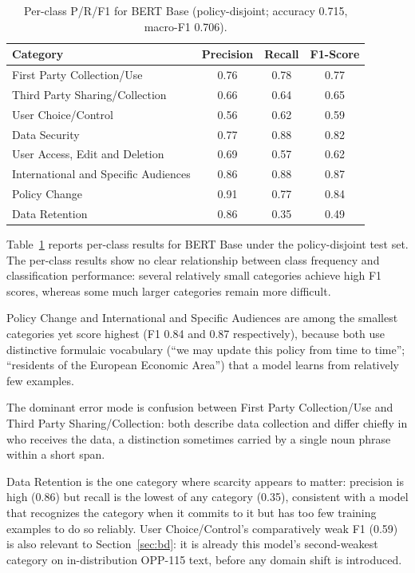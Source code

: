 \documentclass[11pt]{article}
\begin{document}
\begin{table}[t]
\centering
\footnotesize
\setlength{\tabcolsep}{3pt}
\begin{tabularx}{\columnwidth}{@{}Xccc@{}}
\toprule
\textbf{Category} & \textbf{Precision} & \textbf{Recall} & \textbf{F1-Score} \\
\midrule
First Party Collection/Use & 0.76 & 0.78 & 0.77 \\
Third Party Sharing/Collection & 0.66 & 0.64 & 0.65 \\
User Choice/Control & 0.56 & 0.62 & 0.59 \\
Data Security & 0.77 & 0.88 & 0.82 \\
User Access, Edit and Deletion & 0.69 & 0.57 & 0.62 \\
International and Specific Audiences & 0.86 & 0.88 & 0.87 \\
Policy Change & 0.91 & 0.77 & 0.84 \\
Data Retention & 0.86 & 0.35 & 0.49 \\
\bottomrule
\end{tabularx}
\caption{Per-class P/R/F1 for BERT Base (policy-disjoint; accuracy 0.715, macro-F1 0.706).}
\label{tab:perclass}
\end{table}

Table~\ref{tab:perclass} reports per-class results for BERT Base under the policy-disjoint test set. The per-class results show no clear relationship between class frequency and classification performance: several relatively small categories achieve high F1 scores, whereas some much larger categories remain more difficult.

Policy Change and International and Specific Audiences are among the smallest categories yet score highest (F1 0.84 and 0.87 respectively), because both use distinctive formulaic vocabulary (``we may update this policy from time to time''; ``residents of the European Economic Area'') that a model learns from relatively few examples.

The dominant error mode is confusion between First Party Collection/Use and Third Party Sharing/Collection: both describe data collection and differ chiefly in who receives the data, a distinction sometimes carried by a single noun phrase within a short span.

Data Retention is the one category where scarcity appears to matter: precision is high (0.86) but recall is the lowest of any category (0.35), consistent with a model that recognizes the category when it commits to it but has too few training examples to do so reliably. User Choice/Control's comparatively weak F1 (0.59) is also relevant to Section~\ref{sec:bd}: it is already this model's second-weakest category on in-distribution OPP-115 text, before any domain shift is introduced.
\end{document}
